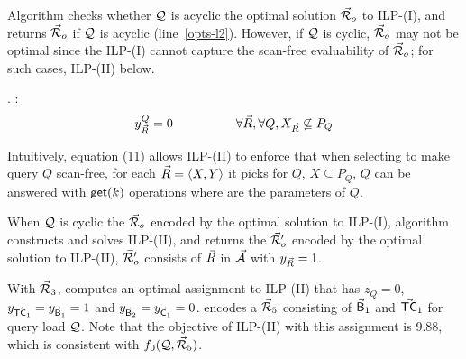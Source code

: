 \vspace{0.8ex}
Algorithm \opts checks whether $\mathcal Q$ is acyclic \wrt the optimal
solution $\vec{{\mathcal R}}_{o}$ to ILP-(I), and returns $\vec{{\mathcal R}}_{o}$ 
if $\mathcal Q$ is acyclic (line~\ref{opts-l2}). However, if $\mathcal Q$ is
cyclic, $\vec{{\mathcal R}}_{o}$ may not be optimal since the ILP-(I) cannot
capture the scan-free evaluability of $\vec{{\mathcal R}}_{o}$;
for such cases,  ILP-(II) below.


\vspace{0.36ex}

.
:
\vspace{-0.7ex}
\begin{alignat}{2}                                                       
&  y_{\vec{R}}^{Q} = 0 &~~~~~~~~~~~~\forall \vec{R}, \forall Q, X_{\vec{R}}\not\subseteq P_{Q}
\end{alignat}                                                            

\vspace{-0.7ex}

Intuitively, equation (11) allows ILP-(II) to enforce that when
selecting \bss to make query $Q$ scan-free, for each
\bs $\vec{R} \allowbreak = \allowbreak \langle X,\allowbreak Y\rangle$ it picks for $Q$, $X\subseteq
P_{Q}$, \ie $Q$ can be answered with $\protect\mathsf{get}(k)$ operations where
 are the parameters of $Q$. 


\vspace{0.36ex}
When $\mathcal Q$ is cyclic \wrt the \bds $\vec{{\mathcal R}}_{o}$ encoded by the
optimal solution to ILP-(I), algorithm \opts constructs and solves
ILP-(II), and returns the \bds $\vec{{\mathcal R}}_{o}'$ encoded by the
optimal solution to ILP-(II), \ie $\vec{{\mathcal R}}_{o}'$ consists of \bss
$\vec{R}$ in $\vec{{\mathcal A}}$ with $y_{\vec{R}} = 1$. 

\begin{example}\label{exa-ILP-II}
With $\vec{{\mathcal R}}_{3}$, \opts computes an optimal assignment to
ILP-(II) that has $z_{Q} = 0$, %
$y_{\vec{\protect\mathsf{TC}}_{1}} = y_{\vec{\protect\mathsf{B}}_{1}} = 1$ and
$y_{\vec{\protect\mathsf{B}}_{2}} = y_{\vec{\protect\mathsf{C}}_{1}} = 0$. %
 encodes a
\bds $\vec{{\mathcal R}}_{5}$ consisting of $\vec{\protect\mathsf{B}}_{1}$ and
$\vec{\protect\mathsf{TC}}_{1}$ for query load $\mathcal Q$. Note that the objective of ILP-(II)
with this assignment is 9.88, which is consistent with $f_{0}(\mathcal Q,
\vec{{\mathcal R}}_{5})$. 
\end{example}

